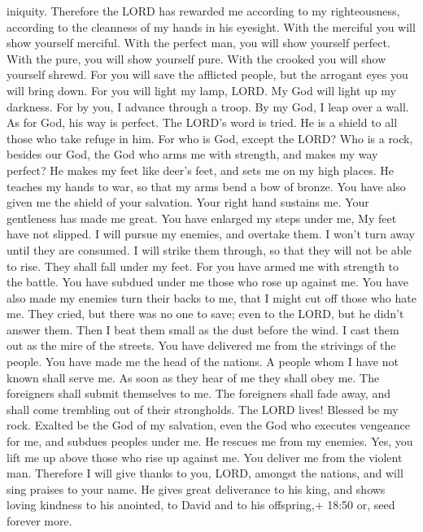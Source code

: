 iniquity.  Therefore the LORD has rewarded me according to
my righteousness, according to the cleanness of my hands in his
eyesight.  With the merciful you will show yourself
merciful. With the perfect man, you will show yourself perfect.
 With the pure, you will show yourself pure. With the
crooked you will show yourself shrewd.  For you will save
the afflicted people, but the arrogant eyes you will bring down.
 For you will light my lamp, LORD. My God will light up my
darkness.  For by you, I advance through a troop. By my
God, I leap over a wall.  As for God, his way is perfect.
The LORD's word is tried. He is a shield to all those who take refuge in
him.  For who is God, except the LORD? Who is a rock,
besides our God,  the God who arms me with strength, and
makes my way perfect?  He makes my feet like deer's feet,
and sets me on my high places.  He teaches my hands to war,
so that my arms bend a bow of bronze.  You have also given
me the shield of your salvation. Your right hand sustains me. Your
gentleness has made me great.  You have enlarged my steps
under me, My feet have not slipped.  I will pursue my
enemies, and overtake them. I won't turn away until they are consumed.
 I will strike them through, so that they will not be able
to rise. They shall fall under my feet.  For you have armed
me with strength to the battle. You have subdued under me those who rose
up against me.  You have also made my enemies turn their
backs to me, that I might cut off those who hate me.  They
cried, but there was no one to save; even to the LORD, but he didn't
answer them.  Then I beat them small as the dust before the
wind. I cast them out as the mire of the streets.  You have
delivered me from the strivings of the people. You have made me the head
of the nations. A people whom I have not known shall serve me.
 As soon as they hear of me they shall obey me. The
foreigners shall submit themselves to me.  The foreigners
shall fade away, and shall come trembling out of their strongholds.
 The LORD lives! Blessed be my rock. Exalted be the God of
my salvation,  even the God who executes vengeance for me,
and subdues peoples under me.  He rescues me from my
enemies. Yes, you lift me up above those who rise up against me. You
deliver me from the violent man.  Therefore I will give
thanks to you, LORD, amongst the nations, and will sing praises to your
name.  He gives great deliverance to his king, and shows
loving kindness to his anointed, to David and to his offspring,+ 18:50
or, seed forever more.

